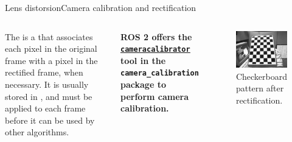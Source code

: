 \begin{frame}{Lens distorsion}{Camera calibration and rectification}
	\begin{columns}
		The  is a  that associates each pixel in the original frame with a pixel in the rectified frame,  when necessary.
    \newline\newline
    It is usually stored in , and must be applied to each frame before it can be used by other algorithms.
    \vspace{.45cm}
    \begin{block}{}
      \centering
      \textbf{ROS 2 offers the \href{https://navigation.ros.org/tutorials/docs/camera_calibration.html}{\color{blue}\underline{\texttt{cameracalibrator}}} tool in the \texttt{camera\_calibration} package to perform camera calibration.}
    \end{block}

		\begin{figure}
			\centering
			\includegraphics[width=.9\textwidth]{calibrated}
			\caption{Checkerboard pattern after rectification.}
			\label{fig:calibrated}
		\end{figure}
	\end{columns}
\end{frame}

